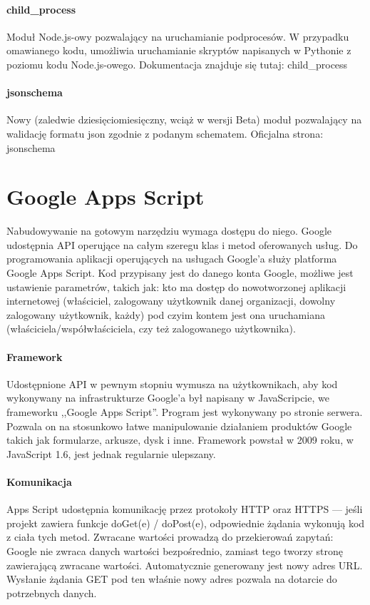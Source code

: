 \paragraph{child\_process}
Moduł Node.js-owy pozwalający na uruchamianie podprocesów. W przypadku omawianego kodu, umożliwia uruchamianie skryptów napisanych  w Pythonie z poziomu kodu Node.js-owego.
\ind Dokumentacja znajduje się tutaj: child\_process \cite{childprocess}
\paragraph{jsonschema}
\ind Nowy (zaledwie dziesięciomiesięczny, wciąż w wersji Beta) moduł pozwalający na walidację formatu json zgodnie z podanym schematem.
\ind Oficjalna strona: jsonschema \cite{jsonschema}

\section{Google Apps Script}
Nabudowywanie na gotowym narzędziu wymaga dostępu do niego. Google udostępnia API operujące na całym szeregu klas i metod oferowanych usług. Do programowania aplikacji operujących na usługach Google'a służy platforma Google Apps Script. Kod przypisany jest do danego konta Google, możliwe jest ustawienie parametrów, takich  jak: kto ma dostęp do nowotworzonej aplikacji internetowej (właściciel, zalogowany użytkownik danej organizacji, dowolny zalogowany użytkownik, każdy) pod czyim kontem jest ona uruchamiana (właściciela/współwłaściciela, czy też zalogowanego użytkownika). 

\paragraph{Framework}
Udostępnione API w pewnym stopniu wymusza na użytkownikach, aby kod wykonywany na infrastrukturze Google'a był napisany w JavaScripcie, we frameworku ,,Google Apps Script''. Program jest wykonywany po stronie serwera. Pozwala on na stosunkowo łatwe manipulowanie działaniem produktów Google takich jak formularze, arkusze, dysk i inne. 
\ind Framework powstał w 2009 roku, w JavaScript 1.6, jest jednak regularnie ulepszany.

\paragraph{Komunikacja}
 Apps Script udostępnia komunikację przez protokoły HTTP oraz HTTPS --- jeśli projekt zawiera funkcje doGet(e) / doPost(e), odpowiednie żądania wykonują kod z ciała tych metod. Zwracane wartości prowadzą do przekierowań zapytań: Google nie zwraca danych wartości bezpośrednio, zamiast tego tworzy stronę zawierającą zwracane wartości. Automatycznie generowany jest nowy adres URL. Wysłanie żądania GET pod ten właśnie nowy adres pozwala na dotarcie do potrzebnych danych. 
